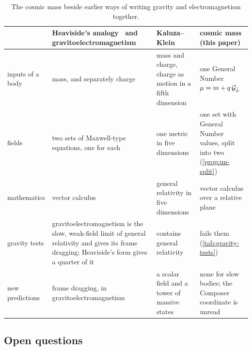 \begin{table}[t]
\caption{The cosmic mass beside earlier ways of writing gravity and electromagnetism together.}
\label{tab:earlier}
\small
\begin{tabularx}{\textwidth}{@{}>{\raggedright\arraybackslash}p{} >{\raggedright\arraybackslash}X >{\raggedright\arraybackslash}X >{\raggedright\arraybackslash}X@{}}
\toprule
 & Heaviside's analogy~\citep{Heaviside1893} and gravitoelectromagnetism~\citep{Mashhoon2003} & Kaluza--Klein~\citep{Kaluza1921,Klein1926} & cosmic mass (this paper) \\
\midrule
inputs of a body & mass, and separately charge & mass and charge, charge as motion in a fifth dimension & one General Number $\mu = m + q\,\mathcal{G}_{\bar{\phi}}$ \\
fields & two sets of Maxwell-type equations, one for each & one metric in five dimensions & one set with General Number values, split into two (\cref{prop:un-split}) \\
mathematics & vector calculus & general relativity in five dimensions & vector calculus over a relative plane \\
gravity tests & gravitoelectromagnetism is the slow, weak-field limit of general relativity and gives its frame dragging; Heaviside's form gives a quarter of it & contains general relativity & fails them (\cref{tab:gravity-tests}) \\
new predictions & frame dragging, in gravitoelectromagnetism & a scalar field and a tower of massive states & none for slow bodies; the Composer coordinate is unread \\
\bottomrule
\end{tabularx}
\end{table}

\subsection{Open questions}\label{subsec:open}


